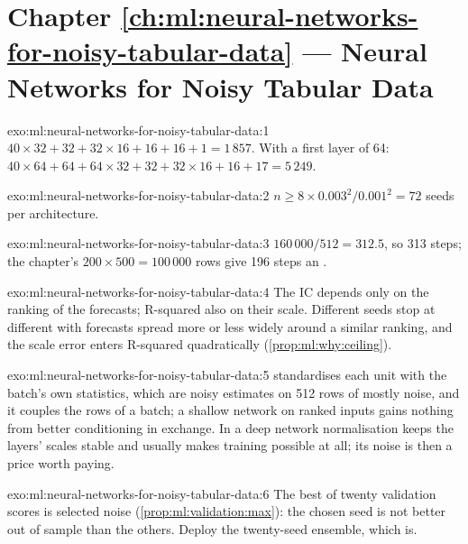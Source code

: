 \section*{Chapter \ref{ch:ml:neural-networks-for-noisy-tabular-data} --- Neural Networks for Noisy Tabular Data}

\begin{solution}{exo:ml:neural-networks-for-noisy-tabular-data:1}
$40\times32 + 32 + 32\times16 + 16 + 16 + 1 = 1\,857$. With a first layer of 64: $40\times64 + 64 + 64\times32 + 32 +
32\times16 + 16 + 17 = 5\,249$.
\end{solution}

\begin{solution}{exo:ml:neural-networks-for-noisy-tabular-data:2}
$n \ge 8\times0.003^2/0.001^2 = 72$ seeds per architecture.
\end{solution}

\begin{solution}{exo:ml:neural-networks-for-noisy-tabular-data:3}
$160\,000/512 = 312.5$, so 313 steps; the chapter's $200\times500 = 100\,000$ rows give 196 steps an .
\end{solution}

\begin{solution}{exo:ml:neural-networks-for-noisy-tabular-data:4}
The IC depends only on the ranking of the forecasts; R-squared also on their scale. Different seeds stop at different
 with forecasts spread more or less widely around a similar ranking, and the scale error enters R-squared
quadratically (\cref{prop:ml:why:ceiling}).
\end{solution}

\begin{solution}{exo:ml:neural-networks-for-noisy-tabular-data:5}
 standardises each unit with the batch's own statistics, which are noisy estimates on 512 rows of
mostly noise, and it couples the rows of a batch; a shallow network on ranked inputs gains nothing from better
conditioning in exchange. In a deep network normalisation keeps the layers' scales stable and usually makes training
possible at all; its noise is then a price worth paying.
\end{solution}

\begin{solution}{exo:ml:neural-networks-for-noisy-tabular-data:6}
The best of twenty validation scores is selected noise (\cref{prop:ml:validation:max}): the chosen seed is not better
out of sample than the others. Deploy the twenty-seed ensemble, which is.
\end{solution}

